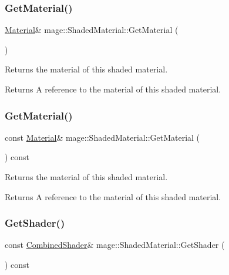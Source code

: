 \subsubsection{\texorpdfstring{Get\+Material()}{GetMaterial()}\hspace{0.1cm}{\footnotesize\ttfamily [1/2]}}
{\footnotesize\ttfamily \hyperlink{structmage_1_1_material}{Material}\& mage\+::\+Shaded\+Material\+::\+Get\+Material (\begin{DoxyParamCaption}{ }\end{DoxyParamCaption})}

Returns the material of this shaded material.

\begin{DoxyReturn}{Returns}
A reference to the material of this shaded material. 
\end{DoxyReturn}
\hypertarget{structmage_1_1_shaded_material_a936a1cb2c79b28818814ac504d059ea3}{}\label{structmage_1_1_shaded_material_a936a1cb2c79b28818814ac504d059ea3} 
\subsubsection{\texorpdfstring{Get\+Material()}{GetMaterial()}\hspace{0.1cm}{\footnotesize\ttfamily [2/2]}}
{\footnotesize\ttfamily const \hyperlink{structmage_1_1_material}{Material}\& mage\+::\+Shaded\+Material\+::\+Get\+Material (\begin{DoxyParamCaption}{ }\end{DoxyParamCaption}) const}

Returns the material of this shaded material.

\begin{DoxyReturn}{Returns}
A reference to the material of this shaded material. 
\end{DoxyReturn}
\hypertarget{structmage_1_1_shaded_material_ac03da6f1dfd81fc19da5a8f8214662ee}{}\label{structmage_1_1_shaded_material_ac03da6f1dfd81fc19da5a8f8214662ee} 
\subsubsection{\texorpdfstring{Get\+Shader()}{GetShader()}}
{\footnotesize\ttfamily const \hyperlink{structmage_1_1_combined_shader}{Combined\+Shader}\& mage\+::\+Shaded\+Material\+::\+Get\+Shader (\begin{DoxyParamCaption}{ }\end{DoxyParamCaption}) const}


